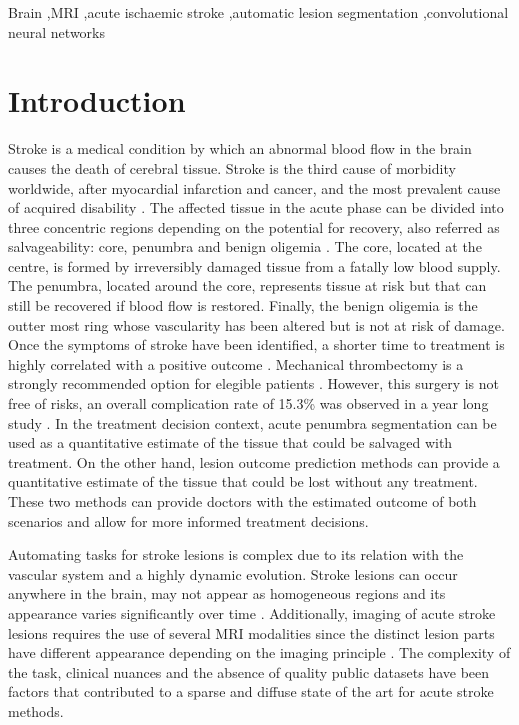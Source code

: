 \documentclass[letterpaper,final,authoryear,3p,times,twocolumn]{elsarticle}
\begin{document}
\begin{frontmatter}
	\begin{keyword}
		Brain \sep MRI \sep acute ischaemic stroke \sep automatic lesion segmentation \sep convolutional neural networks 
	\end{keyword}
	
\end{frontmatter}


\section{Introduction}

Stroke is a medical condition by which an abnormal blood flow in the brain causes the death of cerebral tissue. Stroke is the third cause of morbidity worldwide, after myocardial infarction and cancer, and the most prevalent cause of acquired disability \citep{Redon2011}. The affected tissue in the acute phase can be divided into three concentric regions depending on the potential for recovery, also referred as salvageability: core, penumbra and benign oligemia \citep{Rekik2012}. The core, located at the centre, is formed by irreversibly damaged tissue from a fatally low blood supply. The penumbra, located around the core, represents tissue at risk but that can still be recovered if blood flow is restored. Finally, the benign oligemia is the outter most ring whose vascularity has been altered but is not at risk of damage. Once the symptoms of stroke have been identified, a shorter time to treatment is highly correlated with a positive outcome \citep{Sheth2015}. Mechanical thrombectomy is a strongly recommended option for elegible patients \citep{Campbell2017}. However, this surgery is not free of risks, an overall complication rate of 15.3\% was observed in a year long study \citep{Singh2017}. In the treatment decision context, acute penumbra segmentation can be used as a quantitative estimate of the tissue that could be salvaged with treatment. On the other hand, lesion outcome prediction methods can provide a quantitative estimate of the tissue that could be lost without any treatment. These two methods can provide doctors with the estimated outcome of both scenarios and allow for more informed treatment decisions.

Automating tasks for stroke lesions is complex due to its relation with the vascular system and a highly dynamic evolution. Stroke lesions can occur anywhere in the brain, may not appear as homogeneous regions and its appearance varies significantly over time \citep{Maier2017isles}. Additionally, imaging of acute stroke lesions requires the use of several MRI modalities since the distinct lesion parts have different appearance depending on the imaging principle \citep{Rekik2012}. The complexity of the task, clinical nuances and the absence of quality public datasets have been factors that contributed to a sparse and diffuse state of the art for acute stroke methods.
\end{document}
